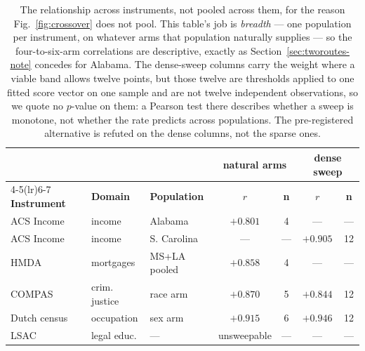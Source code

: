 \documentclass[9pt,conference]{IEEEtran}
\begin{document}
\begin{table}[t]
\caption{The relationship across instruments, not pooled across them, for the reason
Fig.~\ref{fig:crossover} does not pool. This table's job is \emph{breadth} --- one population
per instrument, on whatever arms that population naturally supplies --- so the four-to-six-arm
correlations are descriptive, exactly as Section~\ref{sec:tworoutes-note} concedes for Alabama.
The dense-sweep columns carry the weight where a viable band allows twelve points, but
those twelve are thresholds applied to one fitted score vector on one sample and are not
twelve independent observations, so we quote no $p$-value on them: a Pearson test there
describes whether a sweep is monotone, not whether the rate predicts across populations. The
pre-registered alternative is refuted on the dense columns, not the sparse ones.}
\label{tab:domains}
\centering
\scriptsize
\setlength{\tabcolsep}{2.5pt}
\begin{tabular}{@{}lllcccc@{}}
\toprule
& & & \multicolumn{2}{c}{\textbf{natural arms}} & \multicolumn{2}{c}{\textbf{dense sweep}} \\
\cmidrule(lr){4-5}\cmidrule(lr){6-7}
\textbf{Instrument} & \textbf{Domain} & \textbf{Population} & \textbf{$r$} & \textbf{n} &
\textbf{$r$} & \textbf{n} \\
\midrule
ACS Income & income & Alabama & $+0.801$ & 4 & --- & --- \\
ACS Income & income & S. Carolina & --- & --- & $+0.905$ & 12 \\
HMDA & mortgages & MS+LA pooled & $+0.858$ & 4 & --- & --- \\
COMPAS & crim. justice & race arm & $+0.870$ & 5 & $+0.844$ & 12 \\
Dutch census & occupation & sex arm & $+0.915$ & 6 & $+0.946$ & 12 \\
LSAC & legal educ. & --- & unsweepable & --- & --- & --- \\
\bottomrule
\end{tabular}
\end{table}
\end{document}
